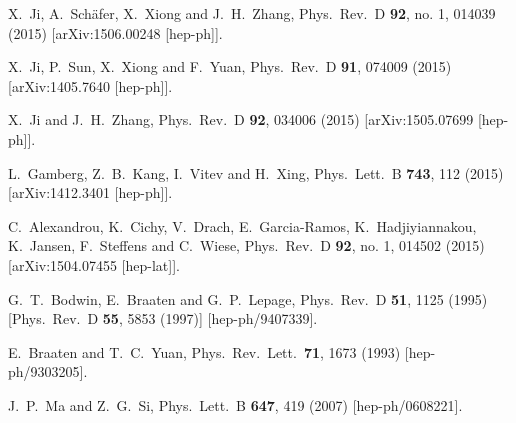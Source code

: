 \documentclass[english,preprint,aps,prd,showpacs,superscriptaddress,nofootinbib,tightenlines]{revtex4}
\begin{document}
\begin{thebibliography}{99}
X.~Ji, A.~Schäfer, X.~Xiong and J.~H.~Zhang,
Phys.\ Rev.\ D {\bf 92}, no. 1, 014039 (2015)   [arXiv:1506.00248 [hep-ph]].

X.~Ji, P.~Sun, X.~Xiong and F.~Yuan,
Phys.\ Rev.\ D {\bf 91}, 074009 (2015) [arXiv:1405.7640 [hep-ph]].

X.~Ji and J.~H.~Zhang,
Phys.\ Rev.\ D {\bf 92}, 034006 (2015)   [arXiv:1505.07699 [hep-ph]].




L.~Gamberg, Z.~B.~Kang, I.~Vitev and H.~Xing,
Phys.\ Lett.\ B {\bf 743}, 112 (2015)   [arXiv:1412.3401 [hep-ph]].

C.~Alexandrou, K.~Cichy, V.~Drach, E.~Garcia-Ramos, K.~Hadjiyiannakou, K.~Jansen, F.~Steffens and C.~Wiese,
Phys.\ Rev.\ D {\bf 92}, no. 1, 014502 (2015)   [arXiv:1504.07455 [hep-lat]].



  G.~T.~Bodwin, E.~Braaten and G.~P.~Lepage,
  Phys.\ Rev.\ D {\bf 51}, 1125 (1995)  [Phys.\ Rev.\ D {\bf 55}, 5853 (1997)]  [hep-ph/9407339].


  E.~Braaten and T.~C.~Yuan,
  Phys.\ Rev.\ Lett.\  {\bf 71}, 1673 (1993)  [hep-ph/9303205].


  J.~P.~Ma and Z.~G.~Si,
  Phys.\ Lett.\ B {\bf 647}, 419 (2007)  [hep-ph/0608221].


\end{thebibliography}
\end{document}
